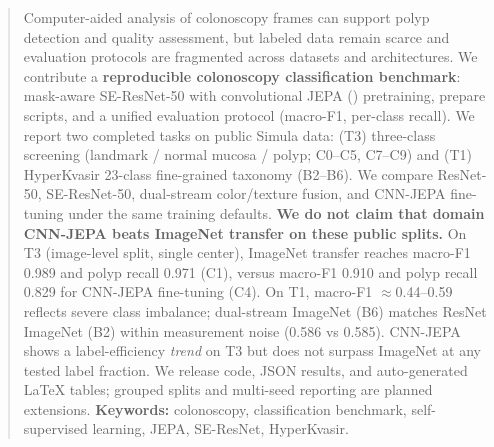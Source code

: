 \begin{abstract}
Computer-aided analysis of colonoscopy frames can support polyp detection and quality assessment, but labeled data remain scarce and evaluation protocols are fragmented across datasets and architectures.
We contribute a \textbf{reproducible colonoscopy classification benchmark}: mask-aware SE-ResNet-50 with convolutional JEPA (\method{}) pretraining, prepare scripts, and a unified evaluation protocol (macro-F1, per-class recall).
We report two completed tasks on public Simula data: (T3) three-class screening (landmark / normal mucosa / polyp; C0--C5, C7--C9) and (T1) HyperKvasir 23-class fine-grained taxonomy (B2--B6).
We compare ResNet-50, SE-ResNet-50, dual-stream color/texture fusion, and CNN-JEPA fine-tuning under the same training defaults.
\textbf{We do not claim that domain CNN-JEPA beats ImageNet transfer on these public splits.}
On T3 (image-level split, single center), ImageNet transfer reaches macro-F1 0.989 and polyp recall 0.971 (C1), versus macro-F1 0.910 and polyp recall 0.829 for CNN-JEPA fine-tuning (C4).
On T1, macro-F1 $\approx$0.44--0.59 reflects severe class imbalance; dual-stream ImageNet (B6) matches ResNet ImageNet (B2) within measurement noise (0.586 vs 0.585).
CNN-JEPA shows a label-efficiency \emph{trend} on T3 but does not surpass ImageNet at any tested label fraction.
We release code, JSON results, and auto-generated LaTeX tables; grouped splits and multi-seed reporting are planned extensions.
\textbf{Keywords:} colonoscopy, classification benchmark, self-supervised learning, JEPA, SE-ResNet, HyperKvasir.
\end{abstract}

